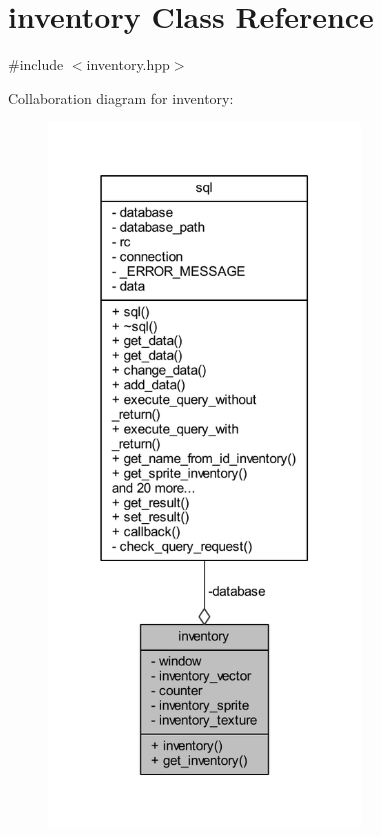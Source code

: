 \hypertarget{classinventory}{}\section{inventory Class Reference}
\label{classinventory}


{\ttfamily \#include $<$inventory.\+hpp$>$}



Collaboration diagram for inventory\+:
\nopagebreak
\begin{figure}[H]
\begin{center}
\leavevmode
\includegraphics[width=235pt]{classinventory__coll__graph}
\end{center}
\end{figure}
